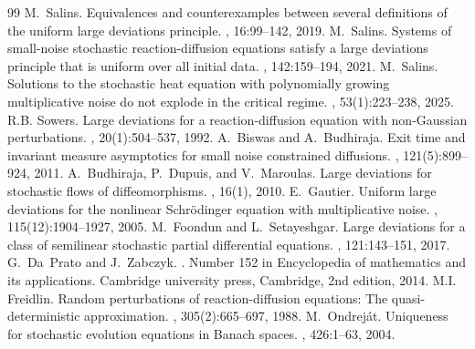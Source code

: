 \documentclass[10pt,a4paper]{amsart}
\numberwithin{equation}{section}
\begin{document}
\begin{thebibliography}{99}
 M.~Salins. \newblock Equivalences and counterexamples between several definitions of the uniform large deviations principle. , 16:99--142, 2019.
 M.~Salins. \newblock Systems of small-noise stochastic reaction-diffusion equations satisfy a large deviations principle that is uniform over all initial data. , 142:159--194, 2021.
 M.~Salins. \newblock Solutions to the stochastic heat equation with polynomially growing multiplicative noise do not explode in the critical regime. , 53(1):223--238, 2025.
 R.B. Sowers. \newblock Large deviations for a reaction-diffusion equation with non-{G}aussian perturbations. , 20(1):504--537, 1992.
 A.~Biswas and A.~Budhiraja. \newblock Exit time and invariant measure asymptotics for small noise constrained diffusions. , 121(5):899--924, 2011.
 A.~Budhiraja, P.~Dupuis, and V.~Maroulas. \newblock Large deviations for stochastic flows of diffeomorphisms. , 16(1), 2010.
 E.~Gautier. \newblock Uniform large deviations for the nonlinear {Schrödinger} equation with multiplicative noise. , 115(12):1904--1927, 2005.
 M.~Foondun and L.~Setayeshgar. \newblock Large deviations for a class of semilinear stochastic partial differential equations. , 121:143--151, 2017.
 G.~Da~Prato and J.~Zabczyk. . \newblock Number 152 in Encyclopedia of mathematics and its applications. Cambridge university press, Cambridge, 2nd edition, 2014.
 M.I. Freidlin. \newblock Random perturbations of reaction-diffusion equations: {T}he quasi-deterministic approximation. , 305(2):665--697, 1988.
 M.~Ondrej{\'a}t. \newblock Uniqueness for stochastic evolution equations in {B}anach spaces. , 426:1--63, 2004.
\end{thebibliography}
\end{document}
